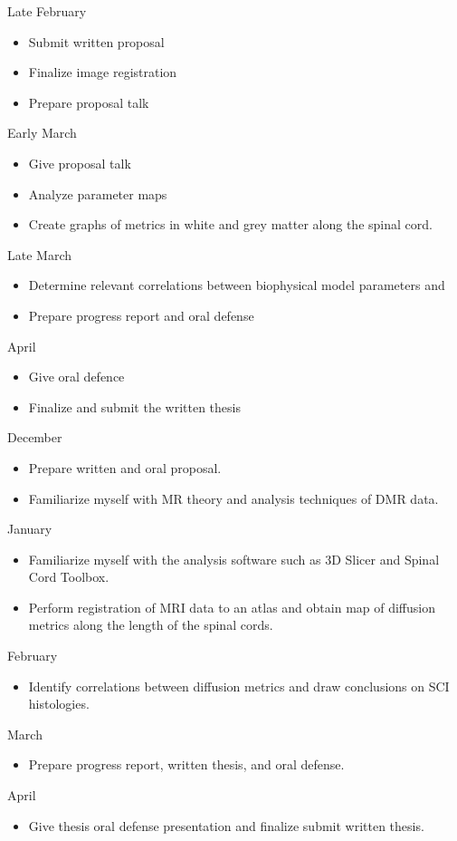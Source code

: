 Late February
\begin{itemize}
    \item Submit written proposal
    \item Finalize image registration
    \item Prepare proposal talk
\end{itemize}

Early March
\begin{itemize}
    \item Give proposal talk
    \item Analyze parameter maps
    \item Create graphs of \dmri metrics in white and grey matter \roi along the spinal cord.
\end{itemize}

Late March
\begin{itemize}
    \item Determine relevant correlations between biophysical model parameters and \sci
    \item Prepare progress report and oral defense
\end{itemize}

April
\begin{itemize}
    \item Give oral defence
    \item Finalize and submit the written thesis
\end{itemize}


December
\begin{itemize}
    \item Prepare written and oral proposal.
    \item Familiarize myself with MR theory and analysis techniques of DMR data.
\end{itemize}

January
\begin{itemize}
    \item Familiarize myself with the analysis software such as 3D Slicer and Spinal Cord Toolbox.
    \item Perform registration of MRI data to an atlas and obtain map of diffusion metrics along the length of the spinal cords.
\end{itemize}

February
\begin{itemize}
    \item Identify correlations between diffusion metrics and draw conclusions on SCI histologies.
\end{itemize}

March
\begin{itemize}
    \item Prepare progress report, written thesis, and oral defense.
\end{itemize}

April
\begin{itemize}
    \item Give thesis oral defense presentation and finalize submit written thesis.
\end{itemize}
\fi
